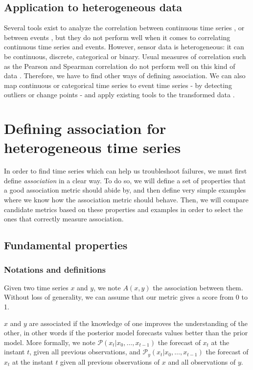 \documentclass[12pt,a4paper]{article}
\begin{document}
\subsection{Application to heterogeneous data}
Several tools exist to analyze the correlation between continuous time series \cite{tool-continuous}, or between events \cite{tool-event3}, but they do not perform well when it comes to correlating continuous time series and events. However, sensor data is heterogeneous: it can be continuous, discrete, categorical or binary.
Usual measures of correlation such as the Pearson and Spearman correlation do not perform well on this kind of data \cite{incident-diagnosis}.
Therefore, we have to find other ways of defining association. We can also map continuous or categorical time series to event time series - by detecting outliers or change points - and apply existing tools to the transformed data \cite{categorical-time-series, detect-change-points}.

\newpage

\section{Defining association for heterogeneous time series}

In order to find time series which can help us troubleshoot failures, we must first define \emph{association} in a clear way. 
To do so, we will define a set of properties that a good association metric should abide by, and then define very simple examples where we know how the association metric should behave. 
Then, we will compare candidate metrics based on these properties and examples in order to select the ones that correctly measure association.

\subsection{Fundamental properties}
\label{sec:properties}

\subsubsection{Notations and definitions}

Given two time series $x$ and $y$, we note $A(x, y)$ the association between them. Without loss of generality, we can assume that our metric gives a score from 0 to 1.

$x$ and $y$ are associated if the knowledge of one improves the understanding of the other, in other words if the posterior model forecasts values better than the prior model.
More formally, we note $\mathcal{P}(x_t | x_0, \ldots, x_{t-1})$ the forecast of $x_t$ at the instant $t$, given all previous observations, and $\mathcal{P}_y(x_t | x_0, \ldots, x_{t-1})$ the forecast of $x_t$ at the instant $t$ given all previous observations of $x$ and all observations of $y$.
\end{document}
